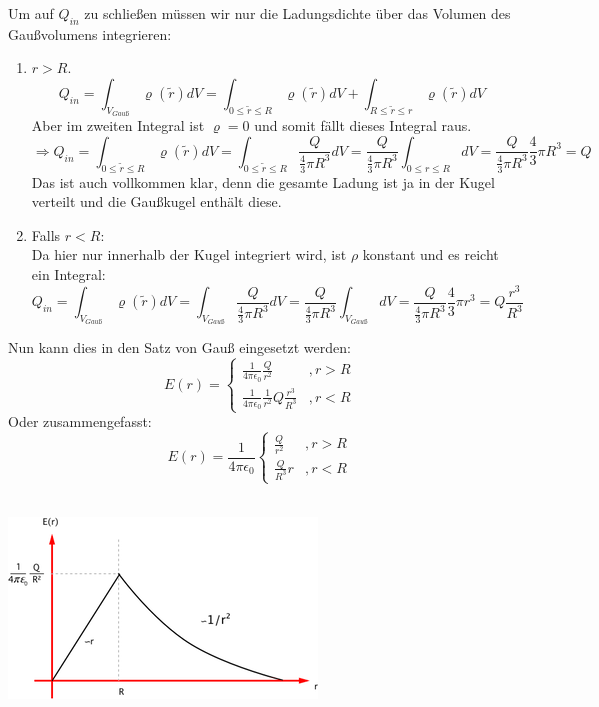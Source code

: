 \documentclass[11pt]{article}
\begin{document}
Um auf $Q_{in}$ zu schließen müssen wir nur die Ladungsdichte über das Volumen des Gaußvolumens integrieren:
\begin{enumerate}
\item $r>R$.
     $$Q_{in}=\int_{V_{Gauß}}\varrho(\tilde{r}) dV=\int_{0\leq \tilde{r}\leq R}\varrho(\tilde{r}) dV+\int_{R\leq \tilde{r}\leq r}\varrho(\tilde{r}) dV$$
    Aber im zweiten Integral ist $\varrho=0$ und somit fällt dieses Integral raus.
    $$\Rightarrow Q_{in}=\int_{0\leq \tilde{r}\leq R}\varrho(\tilde{r}) dV=\int_{0\leq \tilde{r}\leq R}\frac{Q}{\frac{4}{3}\pi R^3} dV=\frac{Q}{\frac{4}{3}\pi R^3}\int_{0\leq r\leq R}dV=\frac{Q}{\frac{4}{3}\pi R^3}\frac{4}{3}\pi R^3=Q$$
    Das ist auch vollkommen klar, denn die gesamte Ladung ist ja in der Kugel verteilt und die Gaußkugel enthält diese.
\item
    Falls $r<R$:\\
    Da hier nur innerhalb der Kugel integriert wird, ist $\rho$ konstant und es reicht ein Integral:
    $$Q_{in}=\int_{V_{Gauß}}\varrho(\tilde{r}) dV=\int_{V_{Gauß}}\frac{Q}{\frac{4}{3}\pi R^3}dV=\frac{Q}{\frac{4}{3}\pi R^3}\int_{V_{Gauß}}dV=\frac{Q}{\frac{4}{3}\pi R^3}\frac{4}{3}\pi r^3=Q\frac{r^3}{R^3}$$
\end{enumerate}
Nun kann dies in den Satz von Gauß eingesetzt werden:
\[
     E(r)=\left\{\begin{array}{ll} \frac{1}{4\pi\epsilon_0}\frac{Q}{r^2} & ,r>R \\
         \frac{1}{4\pi\epsilon_0}\frac{1}{r^2}Q\frac{r^3}{R^3} & ,r<R\end{array}\right.
  \]
  Oder zusammengefasst:
  \[
     \boxed{E(r)=\frac{1}{4\pi\epsilon_0}\left\{\begin{array}{ll} \frac{Q}{r^2} & ,r>R \\
        \frac{Q}{R^3}r & ,r<R\end{array}\right.}
  \]

\hfill\\

\includegraphics{skizzen/14/14_6B7}\\
\end{document}
